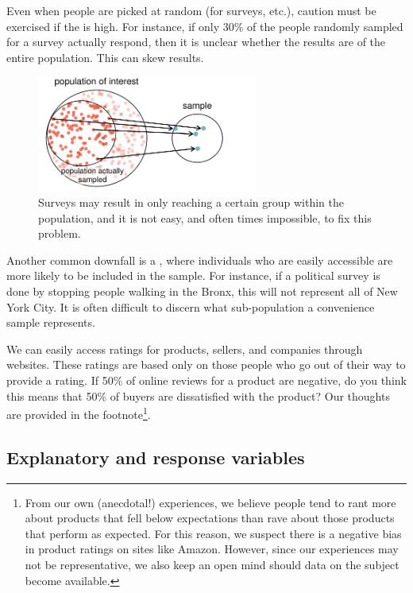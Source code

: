 Even when people are %
picked at random (for surveys, etc.), caution must be exercised if the  is high. For instance, if only 30\% of the people randomly sampled for a survey actually respond, then it is unclear whether the results are  of the entire population. This  can skew results.
\begin{figure}[h]
\centering
\includegraphics[height=1.5in]{01/figures/popToSample/surveySample}
\caption{Surveys may result in only reaching a certain group within the population, and it is not easy, and often times impossible, to fix this problem.}
\label{surveySample}
\end{figure}

Another common downfall is a , where individuals who are easily accessible are more likely to be included in the sample. For instance, if a political survey is done by stopping people walking in the Bronx, this will not represent all of New York City. It is often difficult to discern what sub-population a convenience sample represents.

\begin{exercise}
We can easily access ratings for products, sellers, and companies through websites. These ratings are based only on those people who go out of their way to provide a rating. If 50\% of online reviews for a product are negative, do you think this means that 50\% of buyers are dissatisfied with the product? Our thoughts are provided in the footnote\footnote{From our own (anecdotal!) experiences, we believe people tend to rant more about products that fell below expectations than rave about those products that perform as expected. For this reason, we suspect there is a negative bias in product ratings on sites like Amazon. However, since our experiences may not be representative, we also keep an open mind should data on the subject become available.}.
\end{exercise}


\subsection{Explanatory and response variables}
\label{explanatoryAndResponse}

